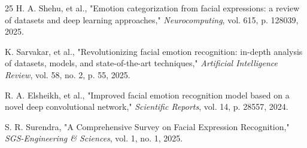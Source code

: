 \documentclass[journal]{IEEEtran}
\begin{document}
\begin{thebibliography}{25}
H. A. Shehu, et al., "Emotion categorization from facial expressions: a review of datasets and deep learning approaches," \textit{Neurocomputing}, vol. 615, p. 128039, 2025.

K. Sarvakar, et al., "Revolutionizing facial emotion recognition: in-depth analysis of datasets, models, and state-of-the-art techniques," \textit{Artificial Intelligence Review}, vol. 58, no. 2, p. 55, 2025.

R. A. Elsheikh, et al., "Improved facial emotion recognition model based on a novel deep convolutional network," \textit{Scientific Reports}, vol. 14, p. 28557, 2024.

S. R. Surendra, "A Comprehensive Survey on Facial Expression Recognition," \textit{SGS-Engineering \& Sciences}, vol. 1, no. 1, 2025.

\end{thebibliography}
\end{document}

